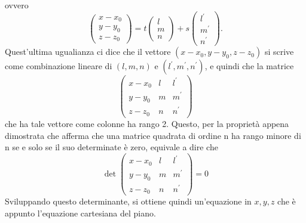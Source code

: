 \begin{teorema}
\begin{osservazione}
    ovvero
    \begin{equation*}
      \begin{pmatrix}
        x-x_0\\
        y-y_0\\
        z-z_0
      \end{pmatrix}=t\begin{pmatrix}
                       l\\
                       m\\
                       n
                     \end{pmatrix} +s
                     \begin{pmatrix}
                       l^\prime\\
                       m^\prime\\
                       n^\prime
                     \end{pmatrix}.
    \end{equation*}
    Quest'ultima ugualianza ci dice che il vettore $(x-x_0,y-y_0,z-z_0)$ si scrive come
    combinazione lineare di $(l,m,n)$ e $(l^\prime,m^\prime,n^\prime)$, e quindi che la matrice
    \begin{equation*}
      \begin{pmatrix}
        x-x_0 & l &l^\prime\\
        y-y_0 & m &m^\prime\\
        z-z_0 & n & n^\prime
      \end{pmatrix}
    \end{equation*}
    che ha tale vettore come colonne ha rango 2. Questo, per la proprietà appena dimostrata che
    afferma che una matrice quadrata di ordine n ha rango minore di n se e solo se il suo
    determinate è zero, equivale a dire che
    \begin{equation*}
      \det\begin{pmatrix}
        x-x_0 & l &l^\prime\\
        y-y_0 & m &m^\prime\\
        z-z_0 & n & n^\prime
      \end{pmatrix}=0
    \end{equation*}
    Sviluppando questo determinante, si ottiene quindi un'equazione in $x,y,z$ che è appunto
    l'equazione cartesiana del piano.
\end{osservazione}
\end{teorema}
